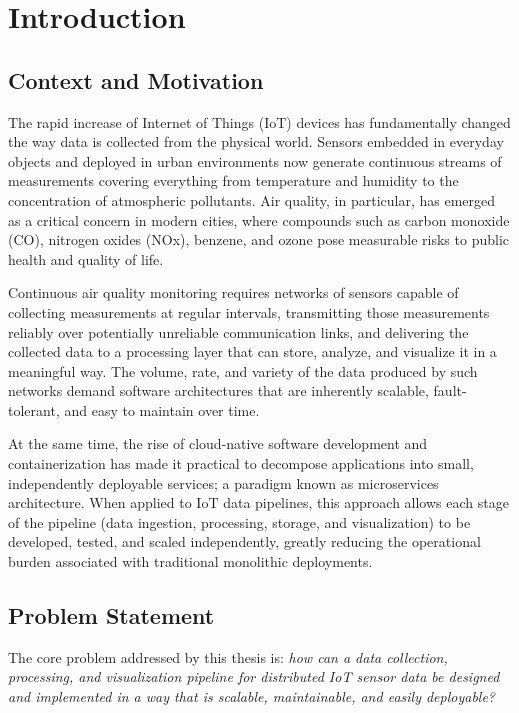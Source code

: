 \chapter{Introduction} \label{ch:introduction}

\section{Context and Motivation}

The rapid increase of Internet of Things (IoT) devices has fundamentally changed the way data is collected from the physical world. Sensors embedded in everyday objects and deployed in urban environments now generate continuous streams of measurements covering everything from temperature and humidity to the concentration of atmospheric pollutants. Air quality, in particular, has emerged as a critical concern in modern cities, where compounds such as carbon monoxide (CO), nitrogen oxides (NOx), benzene, and ozone pose measurable risks to public health and quality of life\cite{Kumar2015}.

Continuous air quality monitoring requires networks of sensors capable of collecting measurements at regular intervals, transmitting those measurements reliably over potentially unreliable communication links, and delivering the collected data to a processing layer that can store, analyze, and visualize it in a meaningful way. The volume, rate, and variety of the data produced by such networks demand software architectures that are inherently scalable, fault-tolerant, and easy to maintain over time.

At the same time, the rise of cloud-native software development and containerization has made it practical to decompose applications into small, independently deployable services; a paradigm known as microservices architecture\cite{microservicesdef}. When applied to IoT data pipelines, this approach allows each stage of the pipeline (data ingestion, processing, storage, and visualization) to be developed, tested, and scaled independently, greatly reducing the operational burden associated with traditional monolithic deployments.

\section{Problem Statement}

The core problem addressed by this thesis is: \textit{how can a data collection, processing, and visualization pipeline for distributed IoT sensor data be designed and implemented in a way that is scalable, maintainable, and easily deployable?}


